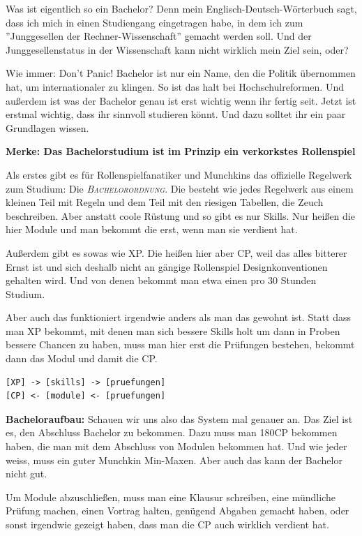 Was ist eigentlich so ein Bachelor? Denn mein Englisch-Deutsch-W\"orterbuch
sagt, dass ich mich in einen Studiengang eingetragen habe, in dem ich zum
''Junggesellen der Rechner-Wissenschaft'' gemacht werden soll. Und der
Junggesellenstatus in der Wissenschaft kann nicht wirklich mein Ziel sein, oder?

Wie immer: Don't Panic! Bachelor ist nur ein Name, den die Politik \"ubernommen
hat, um internationaler zu klingen.  So ist das halt bei Hochschulreformen. Und
au{\ss}erdem ist was der Bachelor genau ist erst wichtig wenn ihr fertig seit.
Jetzt ist erstmal wichtig, dass ihr sinnvoll studieren k\"onnt. Und dazu solltet
ihr ein paar Grundlagen wissen.

\textbf{Merke: Das Bachelorstudium ist im Prinzip ein verkorkstes Rollenspiel}

Als erstes gibt es f\"ur Rollenspielfanatiker und Munchkins das offizielle
Regelwerk zum Studium: Die \textsc{\textit{Bachelorordnung}}. Die besteht wie jedes
Regelwerk aus einem kleinen Teil mit Regeln
und dem Teil mit den riesigen
Tabellen, die Zeuch beschreiben. Aber anstatt coole R\"ustung und so gibt es
nur Skills. Nur hei{\ss}en die hier Module und man bekommt die erst, wenn man sie
verdient hat.

Au{\ss}erdem gibt es sowas wie XP. Die hei{\ss}en hier aber CP, weil das alles
bitterer Ernst ist und sich deshalb nicht an g\"angige Rollenspiel
Designkonventionen gehalten wird. Und von denen bekommt man etwa einen pro 30
Stunden Studium.

Aber auch das funktioniert irgendwie anders als man das gewohnt ist. Statt dass
man XP bekommt, mit denen man sich bessere Skills holt um dann in Proben
bessere Chancen zu haben, muss man hier erst die Pr\"ufungen bestehen, bekommt
dann das Modul und damit die CP.

{\large
\begin{verbatim}
[XP] -> [skills] -> [pruefungen]
[CP] <- [module] <- [pruefungen]
\end{verbatim}}

\textbf{Bacheloraufbau:}
Schauen wir uns also das System mal genauer an.
Das Ziel ist es, den Abschluss Bachelor zu bekommen. Dazu muss man 180CP
bekommen haben, die man mit dem Abschluss von Modulen bekommen hat. Und wie
jeder weiss, muss ein guter Munchkin Min-Maxen. Aber auch das kann der Bachelor
nicht gut.

Um Module abzuschlie{\ss}en, muss man eine Klausur schreiben, eine m\"undliche
Pr\"ufung machen, einen Vortrag halten, gen\"ugend Abgaben gemacht haben, oder
sonst irgendwie gezeigt haben, dass man die CP auch wirklich verdient hat.


